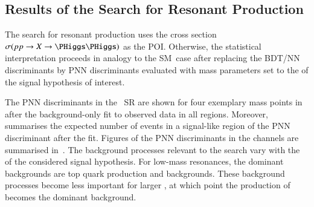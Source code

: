 \begin{table}[htbp]
  \centering

  \caption{Expected and observed upper limits on the the cross section of SM~\HH
    production via \ggF and VBF, \xsecggfvbf, and the SM~\HH signal strength,
    $\mu$, at \SI{95}{\percent}~CL using the \CLs method. The expected limits
    are obtained under the assumption of the background-only
    hypothesis.
    The table is adapted from Ref~\cite{HDBS-2018-40}.}%
  \label{tab:limits_non_resonant}

  
\end{table}


\subsection{Results of the Search for Resonant \HH Production}%
\label{sec:results_res}

The search for resonant \HH production uses the cross
section~$\sigma(\pp \to X \to \HH)$ as the POI. Otherwise, the statistical
interpretation proceeds in analogy to the SM~\HH case after replacing the BDT/NN
discriminants by PNN discriminants evaluated with mass parameters set to the \mX
of the signal hypothesis of interest.

The PNN discriminants in the \hadhad~SR are shown for four exemplary mass points
in~ after the background-only fit to observed
data in all regions. Moreover,  summarises the
expected number of events in a signal-like region of the PNN discriminant after
the fit. Figures of the PNN discriminants in the \lephad channels are summarised
in~. The background
processes relevant to the search vary with the \mX of the considered signal
hypothesis. For low-mass resonances, the dominant backgrounds are top quark
production and \faketauhadvis backgrounds. These background processes become
less important for larger \mX, at which point the production of \Zjets becomes
the dominant background.

